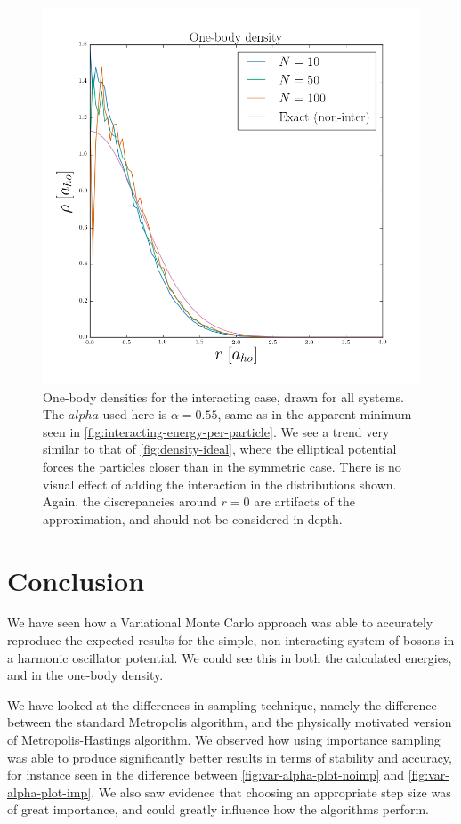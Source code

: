 \documentclass[twocolumn]{article}
\begin{document}
\begin{figure}[ht]
    \centering
    \includegraphics[width=0.8\linewidth]{../results/interacting-density.png}
    \caption{One-body densities for the interacting case, drawn for all systems.
    The $alpha$ used here is $\alpha=0.55$, same as in the apparent minimum seen
    in \autoref{fig:interacting-energy-per-particle}.
    We see a trend very similar to that of \autoref{fig:density-ideal}, where
    the elliptical potential forces the particles closer than in the symmetric
    case. There is no visual effect of adding the interaction in the
    distributions shown. Again, the discrepancies around $r=0$ are artifacts of
    the approximation, and should not be considered in depth.}
    \label{fig:one-body-interaction}
\end{figure}

\section{Conclusion}

We have seen how a Variational Monte Carlo approach was able to accurately
reproduce the expected results for the simple, non-interacting system of bosons
in a harmonic oscillator potential. We could see this in both the calculated
energies, and in the one-body density.

We have looked at the differences in sampling technique, namely the difference
between the standard Metropolis algorithm, and the physically motivated version
of Metropolis-Hastings algorithm. We observed how using importance sampling was
able to produce significantly better results in terms of stability and accuracy,
for instance seen in the difference between \autoref{fig:var-alpha-plot-noimp}
and \ref{fig:var-alpha-plot-imp}. We also saw evidence that choosing an
appropriate step size was of great importance, and could greatly influence how
the algorithms perform. 
\end{document}
